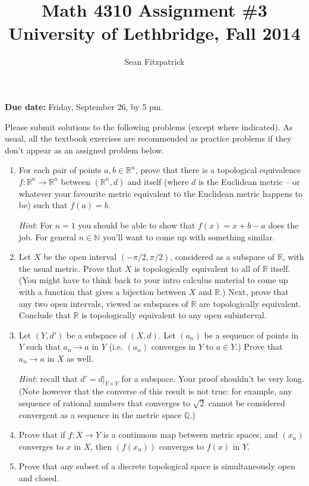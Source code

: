 \documentclass[letterpaper,12pt]{article}
\title{Math 4310 Assignment \#3\\University of Lethbridge, Fall 2014}
\author{Sean Fitzpatrick}
\newcommand{\R}{\mathbb{R}}
\begin{document}
 \maketitle

{\bf Due date:} Friday, September 26, by 5 pm.

\bigskip

Please submit solutions to the following problems (except where indicated). As usual, all the textbook exercises are recommended as practice problems if they don't appear as an assigned problem below.

\begin{enumerate}
\item For each pair of points $a,b\in\mathbb{R}^n$, prove that there is a topological equivalence $f:\R^n\to \R^n$ between $(\R^n,d)$ and itself (where $d$ is the Euclidean metric -- or whatever your favourite metric equivalent to the Euclidean metric happens to be) such that $f(a)=b$.

{\em Hint}: For $n=1$ you should be able to show that $f(x)=x+b-a$ does the job. For general $n\in\mathbb{N}$ you'll want to come up with something similar.

\item Let $X$ be the open interval $(-\pi/2,\pi/2)$, considered as a subspace of $\R$, with the usual metric. Prove that $X$ is topologically equivalent to all of $\R$ itself. (You might have to think back to your intro calculus material to come up with a function that gives a bijection between $X$ and $\R$.) Next, prove that any two open intervals, viewed as subspaces of $\R$ are topologically equivalent. Conclude that $\R$ is topologically equivalent to any open subinterval.

\item Let $(Y,d')$ be a subspace of $(X,d)$. Let $(a_n)$ be a sequence of points in $Y$ such that $a_n\to a$ in $Y$ (i.e. $(a_n)$ converges in $Y$ to $a\in Y$.) Prove that $a_n\to a$ in $X$ as well.

{\em Hint}: recall that $d' = d|_{Y\times Y}$ for a subspace. Your proof shouldn't be very long. (Note however that the converse of this result is not true: for example, any sequence of rational numbers that converges to $\sqrt{2}$ cannot be considered convergent as a sequence in the metric space $\mathbb{Q}$.)
\item Prove that if $f:X\to Y$ is a continuous map between metric spaces, and $(x_n)$ converges to $x$ in $X$, then $(f(x_n))$ converges to $f(x)$ in $Y$.

\item Prove that any subset of a discrete topological space is simultaneously open and closed.


\end{enumerate}
\end{document}

